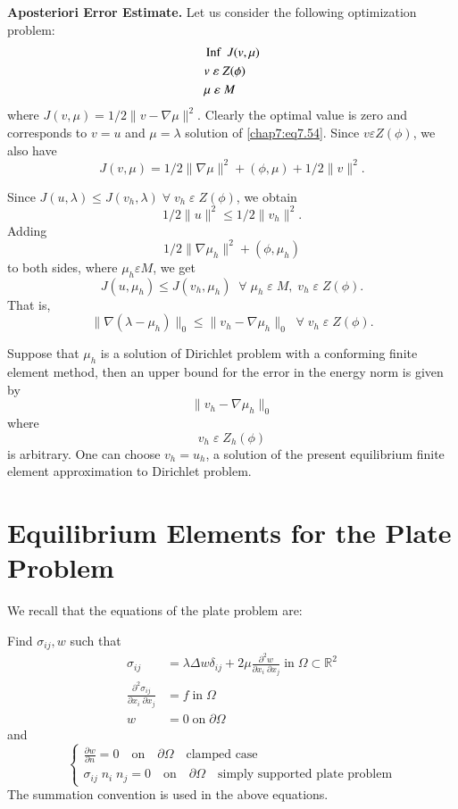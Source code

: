 \begin{REM}\label{chap7:rem10}
{\bf Aposteriori Error Estimate.} Let us consider the following
optimization problem:
\begin{align*}
&\operatorname{Inf} \;J(v,\mu)\\
&v\;\varepsilon \;Z(\phi)\\
&\mu\;\varepsilon \;M
\end{align*}
where $J(v,\mu)=1/2\parallel v-\nabla\mu\parallel^2$. Clearly the
optimal value is zero and corresponds to $v=u$ and $\mu=\lambda$
solution of \eqref{chap7:eq7.54}. Since $v\varepsilon Z(\phi)$, we
also have 
$$
J(v,\mu)=1/2\parallel\nabla\mu\parallel^2+(\phi,\mu)+1/2\parallel
v\parallel^2.
$$

Since $J(u,\lambda)\leq J(v_h,\lambda)\;\forall \;v_h\;\varepsilon
\;Z(\phi)$, we obtain
$$
1/2\parallel u\parallel^2\leq 1/2\parallel v_h\parallel^2.
$$\pageoriginale
Adding
$$
1/2\parallel\nabla\mu_h\parallel^2+(\phi,\mu_h)
$$
to both sides, where $\mu_h\varepsilon M$, we get 
$$
J(u,\mu_h)\leq J(v_h,\mu_h)\; \; \forall \;\mu_h\;\varepsilon \;M, \;v_h
\;\varepsilon \;Z(\phi).
$$
That is,
$$
\parallel\nabla(\lambda-\mu_h)\parallel_0\leq\parallel v_h-\nabla\mu_h
\parallel_0 \; \; \forall \;v_h\;\varepsilon \;Z(\phi).
$$

Suppose that $\mu_h$ is a solution of Dirichlet problem with a
conforming finite element method, then an upper bound for the error in
the energy norm is given by 
$$
\parallel v_h-\nabla\mu_h\parallel_0
$$
where
$$
v_h\;\varepsilon \;Z_h(\phi)
$$
is arbitrary. One can choose $v_h=u_h$, a solution of the present
equilibrium finite element approximation to Dirichlet problem.
\end{REM}

\section{Equilibrium Elements for the Plate
Problem} \label{chap7:ssec7.11}
 We recall that the equations of the
plate problem are:

Find $\sigma_{ij},w$ such that
\begin{align*}
\sigma_{ij}&=\lambda\Delta w\delta_{ij}+2\mu\frac{\partial^2w}
{\partial x_i\;\partial x_j}\;\text{in}\;\Omega\subset\mathbb{R}^2
\tag{7.57} \label{chap7:eq7.57}\\
\frac{\partial^2\sigma_{ij}}{\partial x_i\;\partial x_j} &=
f\;\text{in}\;\Omega \tag{7.57b} \label{chap7:eq7.57b}\\
w&= 0\;\text{on}\;\partial\Omega\tag{7.57c} \label{chap7:eq7.57c} 
\end{align*}\pageoriginale 
and 
\begin{equation*}
\begin{cases}
\frac{\partial w}{\partial n}=0\quad\text{on}\quad\partial\Omega
\quad\text{clamped case}\\
\sigma_{ij}\;n_i\;n_j=0\quad\text{on}\quad\partial\Omega\quad
\text{simply supported plate problem}\tag{7.57d}\label{chap7:eq7.57d}
\end{cases}
\end{equation*}
The summation convention is used in the above equations.

